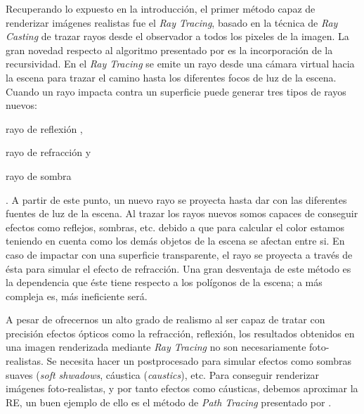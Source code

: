 \documentclass[titlepage,12pt]{report}
\begin{document}
Recuperando lo expuesto en la introducción, el primer método capaz de renderizar imágenes realistas fue el \textit{Ray Tracing}, basado en la técnica de \textit{Ray Casting} de trazar rayos desde el observador a todos los pixeles de la imagen. La gran novedad respecto al algoritmo presentado por \citep{Appel1968} es la incorporación de la recursividad. En el \textit{Ray Tracing} se emite un rayo desde una cámara virtual hacia la escena para trazar el camino hasta los diferentes focos de luz de la escena. Cuando un rayo impacta contra un superficie puede generar tres tipos de rayos nuevos: \begin{enumerate*}[label=\roman*)] \item rayo de reflexión \label{ray:reflected}, \item rayo de refracción y \item rayo de sombra \end{enumerate*}. A partir de este punto, un nuevo rayo se proyecta hasta dar con las diferentes fuentes de luz de la escena. Al trazar los rayos nuevos somos capaces de conseguir efectos como reflejos, sombras, etc. debido a que para calcular el color estamos teniendo en cuenta como los demás objetos de la escena se afectan entre si. En caso de impactar con una superficie transparente, el rayo se proyecta a través de ésta para simular el efecto de refracción. Una gran desventaja de este método es la dependencia que éste tiene respecto a los polígonos de la escena; a más compleja es, más ineficiente será. 

A pesar de ofrecernos un alto grado de realismo al ser capaz de tratar con precisión efectos ópticos como la refracción, reflexión, los resultados obtenidos en una imagen renderizada mediante \textit{Ray Tracing} no son necesariamente foto-realistas. Se necesita hacer un postprocesado para simular efectos como sombras suaves (\textit{soft shwadows}, cáustica (\textit{caustics}), etc. Para conseguir renderizar imágenes foto-realistas, y por tanto efectos como cáusticas, debemos aproximar la RE, un buen ejemplo de ello es el método de \textit{Path Tracing} presentado por \citep{Kajiya1986}.
\end{document}

